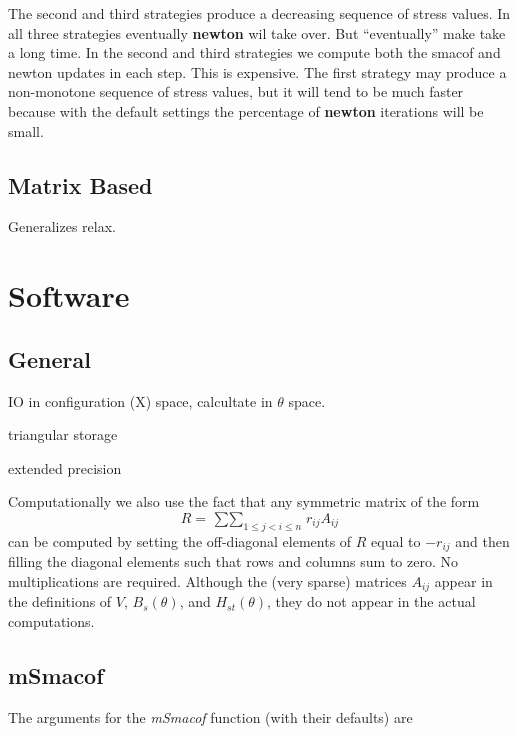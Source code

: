 \documentclass[
  12pt,
]{article}
\newcommand{\jis}{\mathop{\sum\sum}_{1\leq j<i\leq n}}
\begin{document}
The second and third strategies produce a decreasing sequence of stress values.
In all three strategies eventually \textbf{newton} wil take over. But ``eventually''
make take a long time. In the second and third strategies we compute both
the smacof and newton updates in each step. This is expensive. The first strategy
may produce a non-monotone sequence of stress values, but it will tend to
be much faster because with the default settings the percentage of \textbf{newton}
iterations will be small.

\subsection{Matrix Based}\label{matrix-based}

Generalizes relax.

\section{Software}\label{software}

\subsection{General}\label{general}

IO in configuration (X) space, calcultate in \(\theta\) space.

triangular storage

extended precision

Computationally we also use the fact that any symmetric matrix of the form
\begin{equation}
R=\jis r_{ij}A_{ij}
\label{eq:dcmat}
\end{equation}
can be computed by setting the off-diagonal elements of \(R\) equal to \(-r_{ij}\) and then filling the diagonal elements such that rows and columns sum to zero. No multiplications are required. Although the (very sparse) matrices \(A_{ij}\) appear in the definitions of \(V\), \(B_s(\theta)\), and \(H_{st}(\theta)\), they do not appear in the actual computations.

\subsection{mSmacof}\label{msmacof}

The arguments for the \emph{mSmacof} function (with their defaults) are
\end{document}
